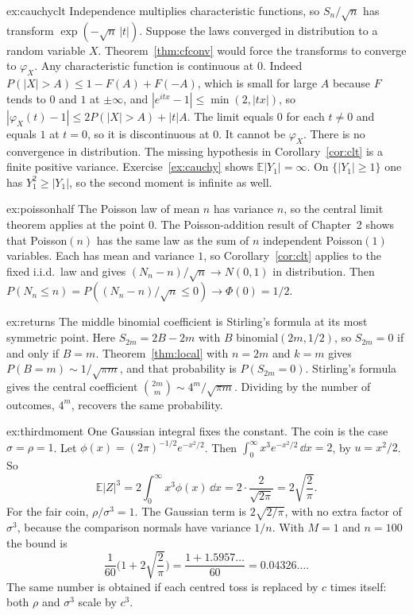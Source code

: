\begin{solution}{ex:cauchyclt}
Independence multiplies characteristic functions, so $S_n/\sqrt n$ has transform $\exp(-\sqrt n\,|t|)$. Suppose the laws converged in distribution to a random variable $X$. Theorem~\ref{thm:cfconv} would force the transforms to converge to $\varphi_X$. Any characteristic function is continuous at $0$. Indeed $P(|X|>A)\le 1-F(A)+F(-A)$, which is small for large $A$ because $F$ tends to $0$ and $1$ at $\pm\infty$, and $|e^{itx}-1|\le\min(2,|tx|)$, so $|\varphi_X(t)-1|\le 2P(|X|>A)+|t|A$. The limit equals $0$ for each $t\ne0$ and equals $1$ at $t=0$, so it is discontinuous at $0$. It cannot be $\varphi_X$. There is no convergence in distribution. The missing hypothesis in Corollary~\ref{cor:clt} is a finite positive variance. Exercise~\ref{ex:cauchy} shows $\mathbb E|Y_1|=\infty$. On $\{|Y_1|\ge1\}$ one has $Y_1^2\ge|Y_1|$, so the second moment is infinite as well.
\end{solution}

\begin{solution}{ex:poissonhalf}
\idea The Poisson law of mean $n$ has variance $n$, so the central limit theorem applies at the point $0$.
\writeup The Poisson-addition result of Chapter~2 shows that Poisson$(n)$ has the same law as the sum of $n$ independent Poisson$(1)$ variables. Each has mean and variance $1$, so Corollary~\ref{cor:clt} applies to the fixed i.i.d.\ law and gives $(N_n-n)/\sqrt n\to N(0,1)$ in distribution. Then $P(N_n\le n)=P((N_n-n)/\sqrt n\le 0)\to\Phi(0)=1/2$.
\end{solution}

\begin{solution}{ex:returns}
\idea The middle binomial coefficient is Stirling's formula at its most symmetric point.
\writeup Here $S_{2m}=2B-2m$ with $B$ binomial$(2m,1/2)$, so $S_{2m}=0$ if and only if $B=m$. Theorem~\ref{thm:local} with $n=2m$ and $k=m$ gives $P(B=m)\sim 1/\sqrt{\pi m}$, and that probability is $P(S_{2m}=0)$. Stirling's formula gives the central coefficient $\binom{2m}{m}\sim 4^m/\sqrt{\pi m}$. Dividing by the number of outcomes, $4^m$, recovers the same probability.
\end{solution}

\begin{solution}{ex:thirdmoment}
\idea One Gaussian integral fixes the constant. The coin is the case $\sigma=\rho=1$.
\writeup Let $\phi(x)=(2\pi)^{-1/2}e^{-x^2/2}$. Then $\int_0^\infty x^3 e^{-x^2/2}\,\dd x=2$, by $u=x^2/2$. So
\[
 \mathbb E|Z|^3=2\int_0^\infty x^3\phi(x)\,\dd x=2\cdot\frac{2}{\sqrt{2\pi}}=2\sqrt{\frac{2}{\pi}}.
\]
For the fair coin, $\rho/\sigma^3=1$. The Gaussian term is $2\sqrt{2/\pi}$, with no extra factor of $\sigma^3$, because the comparison normals have variance $1/n$. With $M=1$ and $n=100$ the bound is
\[
 \frac{1}{60}\Biggl(1+2\sqrt{\frac{2}{\pi}}\Biggr)=\frac{1+1.5957\ldots}{60}=0.04326\ldots.
\]
The same number is obtained if each centred toss is replaced by $c$ times itself: both $\rho$ and $\sigma^3$ scale by $c^3$.
\end{solution}

